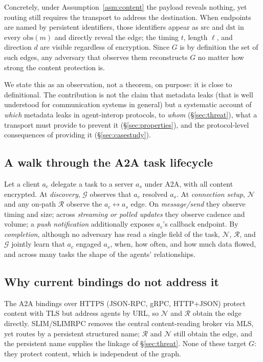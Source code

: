 \documentclass[10pt,twocolumn]{article}
\theoremstyle{definition}
\begin{document}
Concretely, under Assumption~\ref{asm:content} the payload reveals nothing, yet
routing still requires the transport to address the destination. When endpoints
are named by persistent identifiers, those identifiers appear as $\mathrm{src}$
and $\mathrm{dst}$ in every $\mathrm{obs}(m)$ and directly reveal the edge; the
timing $t$, length $\ell$, and direction $d$ are visible regardless of encryption.
Since $G$ is by definition the set of such edges, any adversary that observes them
reconstructs $G$ no matter how strong the content protection is.

We state this as an observation, not a theorem, on purpose: it is close to
definitional. The contribution is not the claim that metadata leaks (that is well
understood for communication systems in general) but a systematic account of
\emph{which} metadata leaks in agent-interop protocols, to \emph{whom}
(\S\ref{sec:threat}), what a transport must provide to prevent it
(\S\ref{sec:properties}), and the protocol-level consequences of providing it
(\S\ref{sec:casestudy}).

\subsection{A walk through the A2A task lifecycle}
Let a client $a_c$ delegate a task to a server $a_s$ under A2A, with all content
encrypted. At \emph{discovery}, $\mathcal{G}$ observes that $a_c$ resolved $a_s$.
At \emph{connection setup}, $\mathcal{N}$ and any on-path $\mathcal{R}$ observe the
$a_c\!\leftrightarrow\!a_s$ edge. On \emph{message/send} they observe timing and
size; across \emph{streaming or polled updates} they observe cadence and volume; a
\emph{push notification} additionally exposes $a_c$'s callback endpoint. By
\emph{completion}, although no adversary has read a single field of the task,
$\mathcal{N}$, $\mathcal{R}$, and $\mathcal{G}$ jointly learn that $a_c$ engaged
$a_s$, when, how often, and how much data flowed, and across many tasks the
shape of the agents' relationships.

\subsection{Why current bindings do not address it}
The A2A bindings over HTTPS (JSON-RPC, gRPC, HTTP+JSON) protect content with TLS
but address agents by URL, so $\mathcal{N}$ and $\mathcal{R}$ obtain the edge
directly. SLIM/SLIMRPC removes the central content-reading broker via MLS, yet
routes by a persistent structured name; $\mathcal{R}$ and $\mathcal{N}$ still
obtain the edge, and the persistent name supplies the linkage of
\S\ref{sec:threat}. None of these target $G$: they protect content, which is
independent of the graph.
\end{document}
